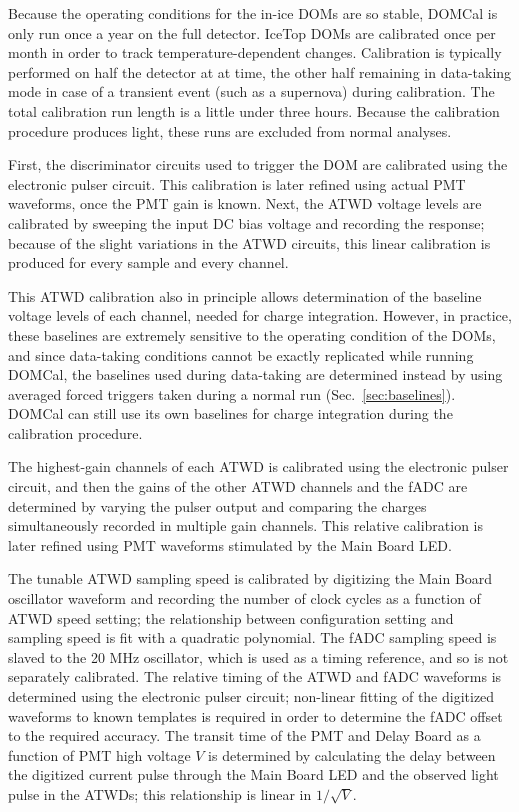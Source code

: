 Because the operating conditions for
the in-ice DOMs are so stable, DOMCal is only run once a year on the full
detector. IceTop DOMs are calibrated once per month in order to track
temperature-dependent changes.  Calibration is
typically performed on half the detector at at time, the other half
remaining in data-taking mode in case of a transient event (such as a
supernova) during calibration. The total calibration run length is a
little under three hours. Because the calibration procedure produces
light, these runs are excluded from normal analyses.

First, the discriminator circuits used to trigger the DOM are calibrated
using the electronic pulser circuit.  This calibration is later refined using actual
PMT waveforms, once the PMT gain is known.  Next, the ATWD voltage levels
are calibrated by sweeping the input DC bias voltage and recording the
response; because of the slight variations in the ATWD circuits, this
linear calibration is produced for every sample and every channel.

This ATWD calibration also in principle allows determination of the baseline
voltage levels of each channel, needed for charge integration.  However, in
practice, these baselines are extremely sensitive to the operating
condition of the DOMs, and since data-taking conditions cannot be exactly
replicated while running DOMCal, the baselines used during data-taking are
determined instead by using averaged forced triggers taken during a normal
run (Sec.~\ref{sec:baselines}).  DOMCal can still use its own
baselines for charge integration during the calibration procedure.

The highest-gain channels of each ATWD is calibrated using the electronic
pulser circuit, and then the gains of the other ATWD channels and the fADC
are determined by varying the pulser output and comparing the charges
simultaneously recorded in multiple gain channels.  This relative
calibration is later refined using PMT waveforms stimulated by the Main
Board LED.

The tunable ATWD sampling speed is calibrated by digitizing the Main Board oscillator
waveform and recording the number of clock cycles as a function of ATWD
speed setting; the relationship between configuration setting and sampling
speed is fit with a quadratic polynomial.  The fADC sampling speed is
slaved to the 20 MHz oscillator, which is used as a timing reference, and
so is not separately calibrated.  The relative timing of 
the ATWD and fADC waveforms is determined using the electronic pulser circuit;
non-linear fitting of the digitized waveforms to known templates is
required in order to determine the fADC offset to the required accuracy.
The transit time of the PMT and Delay Board as a function of PMT high
voltage $V$ is determined by calculating the delay between the digitized
current pulse through the Main Board LED and the observed light pulse in
the ATWDs; this relationship is linear in $1/\sqrt{V}$.

